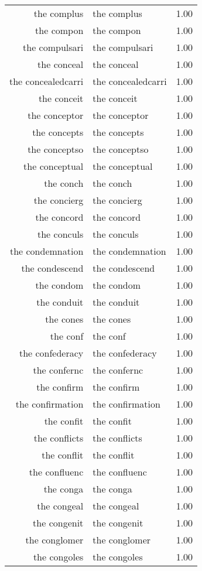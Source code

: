 \begin{table}[ht]
\begin{tabular}{rlr}
  the complus & the complus & 1.00 \\ 
  the compon & the compon & 1.00 \\ 
  the compulsari & the compulsari & 1.00 \\ 
  the conceal & the conceal & 1.00 \\ 
  the concealedcarri & the concealedcarri & 1.00 \\ 
  the conceit & the conceit & 1.00 \\ 
  the conceptor & the conceptor & 1.00 \\ 
  the concepts & the concepts & 1.00 \\ 
  the conceptso & the conceptso & 1.00 \\ 
  the conceptual & the conceptual & 1.00 \\ 
  the conch & the conch & 1.00 \\ 
  the concierg & the concierg & 1.00 \\ 
  the concord & the concord & 1.00 \\ 
  the conculs & the conculs & 1.00 \\ 
  the condemnation & the condemnation & 1.00 \\ 
  the condescend & the condescend & 1.00 \\ 
  the condom & the condom & 1.00 \\ 
  the conduit & the conduit & 1.00 \\ 
  the cones & the cones & 1.00 \\ 
  the conf & the conf & 1.00 \\ 
  the confederacy & the confederacy & 1.00 \\ 
  the confernc & the confernc & 1.00 \\ 
  the confirm & the confirm & 1.00 \\ 
  the confirmation & the confirmation & 1.00 \\ 
  the confit & the confit & 1.00 \\ 
  the conflicts & the conflicts & 1.00 \\ 
  the conflit & the conflit & 1.00 \\ 
  the confluenc & the confluenc & 1.00 \\ 
  the conga & the conga & 1.00 \\ 
  the congeal & the congeal & 1.00 \\ 
  the congenit & the congenit & 1.00 \\ 
  the conglomer & the conglomer & 1.00 \\ 
  the congoles & the congoles & 1.00 \\ 

\end{tabular}
\end{table}
